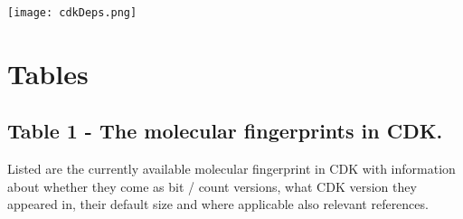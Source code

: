 \documentclass[10pt]{bmcart}
\begin{document}
\begin{backmatter}
\texttt{[image: cdkDeps.png]}


\newpage


\newpage

\section*{Tables}



  \subsection*{Table 1 - The molecular fingerprints in CDK.}
  \label{tab:fingerprints}
  Listed are the currently available molecular fingerprint in CDK with
  information about whether they come as bit / count versions, what CDK version
  they appeared in, their default size and where applicable also relevant
  references.
  \baselineskip


\end{backmatter}
\end{document}
